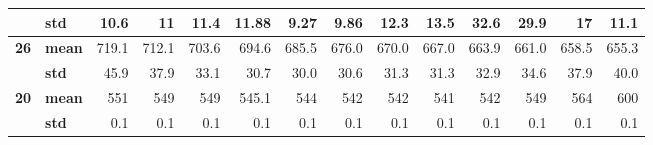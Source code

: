 \begin{table}[htbp]
\begin{tabular}{|c|l|r|r|r|r|r|r|r|r|r|r|r|r|}
\cline{2-14}    \rowcolor[rgb]{ .553,  .706,  .886}      & \textbf{std} & \cellcolor[rgb]{ 1,  1,  1} 10.6 & \cellcolor[rgb]{ 1,  1,  1} 11 & \cellcolor[rgb]{ 1,  1,  1} 11.4 & \cellcolor[rgb]{ 1,  1,  1} 11.88 & \cellcolor[rgb]{ 1,  1,  1} 9.27 & \cellcolor[rgb]{ 1,  1,  1} 9.86 & \cellcolor[rgb]{ 1,  1,  1} 12.3 & \cellcolor[rgb]{ 1,  1,  1} 13.5 & \cellcolor[rgb]{ 1,  1,  1} 32.6 & \cellcolor[rgb]{ 1,  1,  1} 29.9 & \cellcolor[rgb]{ 1,  1,  1} 17 & \cellcolor[rgb]{ 1,  1,  1} 11.1 \bigstrut\\
    \hline
    \rowcolor[rgb]{ .553,  .706,  .886} \textbf{26} & \textbf{mean} & \cellcolor[rgb]{ .851,  .851,  .851} 719.1 & \cellcolor[rgb]{ .851,  .851,  .851} 712.1 & \cellcolor[rgb]{ .851,  .851,  .851} 703.6 & \cellcolor[rgb]{ .851,  .851,  .851} 694.6 & \cellcolor[rgb]{ .851,  .851,  .851} 685.5 & \cellcolor[rgb]{ .851,  .851,  .851} 676.0 & \cellcolor[rgb]{ .851,  .851,  .851} 670.0 & \cellcolor[rgb]{ .851,  .851,  .851} 667.0 & \cellcolor[rgb]{ .851,  .851,  .851} 663.9 & \cellcolor[rgb]{ .851,  .851,  .851} 661.0 & \cellcolor[rgb]{ .851,  .851,  .851} 658.5 & \cellcolor[rgb]{ .851,  .851,  .851} 655.3 \bigstrut\\
\cline{2-14}    \rowcolor[rgb]{ .553,  .706,  .886}      & \textbf{std} & \cellcolor[rgb]{ .851,  .851,  .851} 45.9 & \cellcolor[rgb]{ .851,  .851,  .851} 37.9 & \cellcolor[rgb]{ .851,  .851,  .851} 33.1 & \cellcolor[rgb]{ .851,  .851,  .851} 30.7 & \cellcolor[rgb]{ .851,  .851,  .851} 30.0 & \cellcolor[rgb]{ .851,  .851,  .851} 30.6 & \cellcolor[rgb]{ .851,  .851,  .851} 31.3 & \cellcolor[rgb]{ .851,  .851,  .851} 31.3 & \cellcolor[rgb]{ .851,  .851,  .851} 32.9 & \cellcolor[rgb]{ .851,  .851,  .851} 34.6 & \cellcolor[rgb]{ .851,  .851,  .851} 37.9 & \cellcolor[rgb]{ .851,  .851,  .851} 40.0 \bigstrut\\
    \hline
    \rowcolor[rgb]{ .553,  .706,  .886} \textbf{20} & \textbf{mean} & \cellcolor[rgb]{ 1,  1,  1} 551 & \cellcolor[rgb]{ 1,  1,  1} 549 & \cellcolor[rgb]{ 1,  1,  1} 549 & \cellcolor[rgb]{ 1,  1,  1} 545.1 & \cellcolor[rgb]{ 1,  1,  1} 544 & \cellcolor[rgb]{ 1,  1,  1} 542 & \cellcolor[rgb]{ 1,  1,  1} 542 & \cellcolor[rgb]{ 1,  1,  1} 541 & \cellcolor[rgb]{ 1,  1,  1} 542 & \cellcolor[rgb]{ 1,  1,  1} 549 & \cellcolor[rgb]{ 1,  1,  1} 564 & \cellcolor[rgb]{ 1,  1,  1} 600 \bigstrut\\
\cline{2-14}    \rowcolor[rgb]{ .553,  .706,  .886}      & \textbf{std} & \cellcolor[rgb]{ 1,  1,  1} 0.1 & \cellcolor[rgb]{ 1,  1,  1} 0.1 & \cellcolor[rgb]{ 1,  1,  1} 0.1 & \cellcolor[rgb]{ 1,  1,  1} 0.1 & \cellcolor[rgb]{ 1,  1,  1} 0.1 & \cellcolor[rgb]{ 1,  1,  1} 0.1 & \cellcolor[rgb]{ 1,  1,  1} 0.1 & \cellcolor[rgb]{ 1,  1,  1} 0.1 & \cellcolor[rgb]{ 1,  1,  1} 0.1 & \cellcolor[rgb]{ 1,  1,  1} 0.1 & \cellcolor[rgb]{ 1,  1,  1} 0.1 & \cellcolor[rgb]{ 1,  1,  1} 0.1 \bigstrut\\

\end{tabular}
\end{table}
